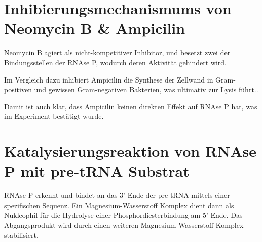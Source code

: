 \documentclass[a4paper,english]{scrreprt}
\begin{document}
\section{Inhibierungsmechanismums von Neomycin B \& Ampicilin}

Neomycin B agiert als nicht-kompetitiver Inhibitor, und besetzt zwei der
 Bindungsstellen der RNAse P, wodurch deren Aktivität gehindert
wird.\cite{skriptv1}

Im Vergleich dazu inhibiert Ampicilin die Synthese der Zellwand in
Gram-positiven und gewissen Gram-negativen Bakterien, was ultimativ zur Lysis
führt.\cite{website:pubchem_ampicilin}.

Damit ist auch klar, dass Ampicilin keinen direkten Effekt auf RNAse P hat, was
im Experiment bestätigt wurde.

\section{Katalysierungsreaktion von RNAse P mit pre-tRNA Substrat}


RNAse P erkennt und bindet an das 3' Ende der pre-tRNA mittels einer
spezifischen Sequenz. Ein Magnesium-Wasserstoff Komplex dient dann als
Nukleophil für die Hydrolyse einer Phosphordiesterbindung am 5' Ende. Das
Abgangsprodukt wird durch einen weiteren Magnesium-Wasserstoff Komplex
stabilisiert.



\end{document}
